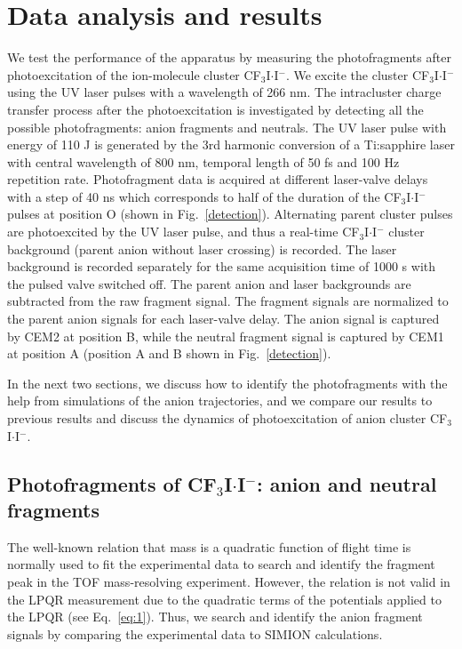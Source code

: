 \documentclass[%
aip,
rsi,
 amsmath,amssymb,
reprint,%
]{revtex4-1}
\begin{document}
\section{Data analysis and results}

We test the performance of the apparatus by measuring the photofragments after photoexcitation of the ion-molecule cluster CF$_3$I$\cdot$I$^-$. We excite the cluster CF$_3$I$\cdot$I$^-$ using the UV laser pulses with a wavelength of 266 nm. The intracluster charge transfer process after the photoexcitation is investigated by detecting all the possible photofragments: anion fragments and neutrals. The UV laser pulse with energy of 110 {\textmu}J is generated by the 3rd harmonic conversion of a Ti:sapphire laser with central wavelength of 800 nm, temporal length of 50 fs and 100 Hz repetition rate. Photofragment data is acquired at different laser-valve delays with a step of 40 ns which corresponds to half of the duration of the CF$_3$I$\cdot$I$^-$ pulses at position O (shown in Fig.~\ref{detection}). Alternating parent cluster pulses are photoexcited by the UV laser pulse, and thus a real-time CF$_3$I$\cdot$I$^-$ cluster background (parent anion without laser crossing) is recorded. The laser background is recorded separately for the same acquisition time of 1000 s with the pulsed valve switched off. The parent anion and laser backgrounds are subtracted from the raw fragment signal. The fragment signals are normalized to the parent anion signals for each laser-valve delay. The anion signal is captured by CEM2 at position B, while the neutral fragment signal is captured by CEM1 at position A (position A and B shown in Fig.~\ref{detection}). 

In the next two sections, we discuss how to identify the photofragments with the help from simulations of the anion trajectories, and we compare our results to previous results and discuss the dynamics of photoexcitation of anion cluster CF$_3$I$\cdot$I$^-$.   

\subsection{Photofragments of CF$_3$I$\cdot$I$^-$: anion and neutral fragments} 

The well-known relation that mass is a quadratic function of flight time is normally used to fit the experimental data to search and identify the fragment peak in the TOF mass-resolving experiment. However, the relation is not valid in the LPQR measurement due to the quadratic terms of the potentials applied to the LPQR (see Eq.~\ref{eq:1}). Thus, we search and identify the anion fragment signals by comparing the experimental data to SIMION\cite{dahl2000simion} calculations. 
\end{document}
